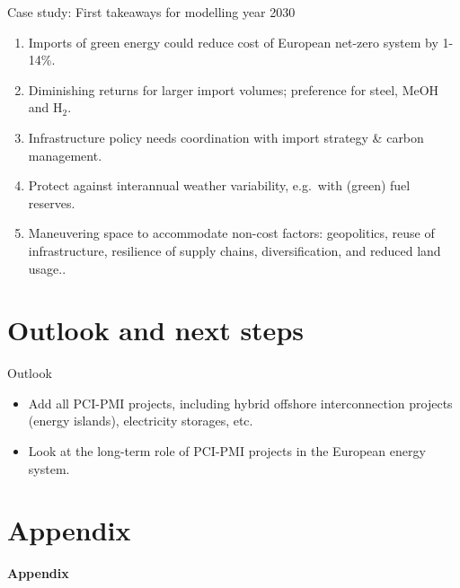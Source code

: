\documentclass[10pt,aspectratio=169,dvipsnames]{beamer}
\begin{document}
\begin{frame}{Case study: First takeaways for modelling year 2030}
  \footnotesize
  \begin{enumerate}
    \setlength\itemsep{1em}

    \item Imports of green energy could reduce cost of European net-zero system
      \alert{by 1-14\%}.
  
    \item \alert{Diminishing returns} for larger import volumes; \alert{preference} for steel, MeOH and H$_2$.

    \item Infrastructure policy needs \alert{coordination} with import strategy \& carbon management.
  
    \item Protect against interannual weather variability, e.g.~with \alert{(green) fuel reserves}.

    \item Maneuvering space to accommodate non-cost factors: \alert{geopolitics},
    \alert{reuse} of infrastructure, \alert{resilience} of supply chains,
    diversification, and reduced land usage..

    
  \end{enumerate}

\end{frame}

\section{Outlook and next steps}
\begin{frame}{Outlook}
  \footnotesize
  \begin{itemize}
    \item Add all PCI-PMI projects, including hybrid offshore interconnection projects (energy islands), electricity storages, etc.
    \item Look at the long-term role of PCI-PMI projects in the European energy system.
  \end{itemize}
\end{frame}


\section{Appendix}


\begin{frame}{\textbf{Appendix}}
\end{frame}
\end{document}
